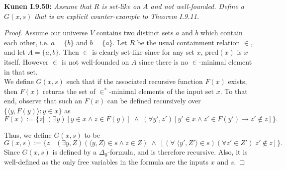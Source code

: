 \documentclass{article}
\begin{document}
\textbf{Kunen I.9.50:} \it Assume that $R$ is set-like on $A$ and not
  well-founded. Define a $G(x,s)$ that is an explicit counter-example to
  Theorem I.9.11.

  \begin{proof}
    Assume our universe $V$ contains two distinct sets $a$ and $b$ which
    contain each other, i.e. $a=\{b\}$ and $b=\{a\}$. Let $R$ be the usual
    containment relation $\in$, and let $A=\{a,b\}$. Then $\in$ is clearly
    set-like since for any set $x$, $\text{pred}(x)$ is $x$ itself. However
    $\in$ is not well-founded on $A$ since there is no $\in$-minimal
    element in that set. \\

    We define $G(x,s)$ such that if the associated recursive function
    $F(x)$ exists, then $F(x)$ returns the set of $\in^*$-minimal elements
    of the input set $x$. To that end, observe that such an $F(x)$ can be
    defined recursively over $\{\langle y,F(y)\rangle: y\in x\}$ as
    \[F(x) :=\{z|\; (\exists y) [y\in x \wedge z\in F(y)]\; \wedge\;
    (\forall y',z')[y'\in x \wedge z'\in F(y') \rightarrow z'\not\in
    z]\}.\]

    Thus, we define $G(x,s)$ to be
    \[G(x,s) :=\{z|\;\; (\exists y,Z)(\langle y,Z\rangle \in s \wedge z\in
    Z)\; \wedge\; [(\forall\; \langle y',Z'\rangle \in s)(\forall z'\in
    Z')\; z'\not\in z]\}.\]
    Since $G(x,s)$ is defined by a $\Delta_0$-formula, and is therefore
    recursive. Also, it is well-defined as the only free variables in the
    formula are the inputs $x$ and $s$.




  \end{proof}
\end{document}

